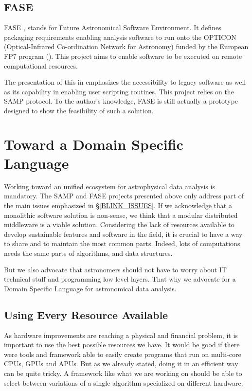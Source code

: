 		\subsection{FASE}
			FASE \citep{Granet}, stands for Future Astronomical Software Environment. It defines packaging requirements enabling analysis software to run onto the OPTICON (Optical-Infrared Co-ordination Network for Astronomy) funded by the European FP7 program (\cite{Fase}). This project aims to enable software to be executed on remote computational resources.
			
			The presentation of this in \citet{Grosbol} emphasizes the accessibility to legacy software as well as its capability in enabling user scripting routines. This project relies on the SAMP protocol. To the author's knowledge, FASE is still actually a prototype designed to show the feasibility of such a solution.

	\section{Toward a Domain Specific Language}
		Working toward an unified ecosystem for astrophysical data analysis is mandatory. The SAMP and FASE projects presented above only address part of the main issues emphasized in \S\ref{BLINK_ISSUES}. If we acknowledge that a monolithic software solution is non-sense, we think that a modular distributed middleware is a viable solution. Considering the lack of resources available to develop sustainable features and software in the field, it is crucial to have a way to share and to maintain the most common parts. Indeed, lots of computations needs the same parts of algorithms, and data structures.
		
		But we also advocate that astronomers should not have to worry about IT technical stuff and programming low level layers. That why we advocate for a Domain Specific Language for astronomical data analysis.

		\subsection{Using Every Resource Available}
			As hardware improvements are reaching a physical and financial problem, it is important to use the best possible resources we have. It would be good if there were tools and framework able to easily create programs that run on multi-core CPUs, GPUs and APUs. But as we already stated, doing it in an efficient way can be quite tricky. A framework like what we are working on should be able to select between variations of a single algorithm specialized on different hardware.

